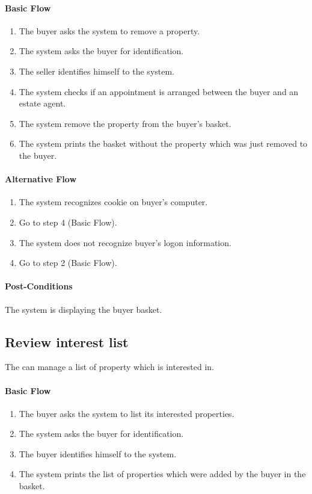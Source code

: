 \documentclass[a4paper,12pt]{article}
\begin{document}
\paragraph{Basic Flow}
\begin{enumerate}
\item The buyer asks the system to remove a property.
\item The system asks the buyer for identification.
\item The seller identifies himself to the system.
\item The system checks if an appointment is arranged between the buyer and an estate agent.
\item The system remove the property from the buyer's basket.
\item The system prints the basket without the property which was just removed to the buyer.
\end{enumerate}
\paragraph{Alternative Flow}
\begin{enumerate}
\item The system recognizes cookie on buyer's computer. 
\item Go to step 4 (Basic Flow).
\item The system does not recognize buyer's logon information.
\item Go to step 2 (Basic Flow).
\end{enumerate}
\paragraph{Post-Conditions}
The system is displaying the buyer basket.

\subsection{Review interest list}
The can manage a list of property which is interested in.
\paragraph{Basic Flow}
\begin{enumerate}
\item The buyer asks the system to list its interested properties.
\item The system asks the buyer for identification.
\item The buyer identifies himself to the system.
\item The system prints the list of properties which were added by the buyer in the basket.
\end{enumerate}
\end{document}
